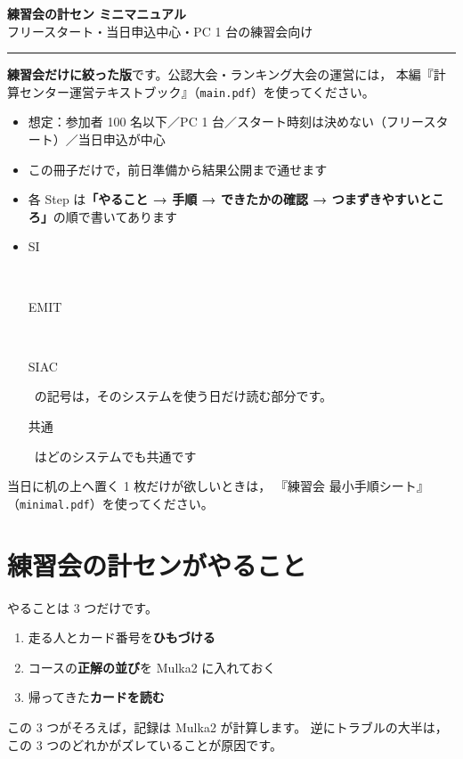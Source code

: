 \documentclass[a4paper,10pt]{ltjsarticle}
\DeclareRobustCommand{\tg}[2]{{\colorbox{#1}{\color{white}\sffamily\bfseries\scriptsize\strut #2}}}
\DeclareRobustCommand{\tSI}{\tg{cSI}{SI}}
\DeclareRobustCommand{\tEMIT}{\tg{cEMIT}{EMIT}}
\DeclareRobustCommand{\tSIAC}{\tg{cSIAC}{SIAC}}
\DeclareRobustCommand{\tALL}{\tg{cALL}{共通}}
\begin{document}
\gtfamily\sffamily

\begin{center}
\vspace*{2mm}
{\LARGE\bfseries 練習会の計セン ミニマニュアル}\\[3mm]
{\normalsize フリースタート・当日申込中心・PC 1 台の練習会向け}\\[2mm]
\textcolor{rulec}{\rule{0.9\textwidth}{0.8pt}}
\end{center}

\vspace{2mm}

\begin{Note}[この冊子について]
\textbf{練習会だけに絞った版}です。公認大会・ランキング大会の運営には，
本編『計算センター運営テキストブック』（\texttt{main.pdf}）を使ってください。
\begin{itemize}
\item 想定：参加者 100 名以下／PC 1 台／スタート時刻は決めない（フリースタート）／当日申込が中心
\item この冊子だけで，前日準備から結果公開まで通せます
\item 各 Step は\textbf{「やること → 手順 → できたかの確認 → つまずきやすいところ」}の順で書いてあります
\item \tSI\ \tEMIT\ \tSIAC\ の記号は，そのシステムを使う日だけ読む部分です。
      \tALL\ はどのシステムでも共通です
\end{itemize}
当日に机の上へ置く 1 枚だけが欲しいときは，
『練習会 最小手順シート』（\texttt{minimal.pdf}）を使ってください。
\end{Note}

\section*{練習会の計センがやること}

やることは 3 つだけです。

\begin{enumerate}
\item 走る人とカード番号を\textbf{ひもづける}
\item コースの\textbf{正解の並び}を Mulka2 に入れておく
\item 帰ってきた\textbf{カードを読む}
\end{enumerate}

この 3 つがそろえば，記録は Mulka2 が計算します。
逆にトラブルの大半は，この 3 つのどれかがズレていることが原因です。
\end{document}
